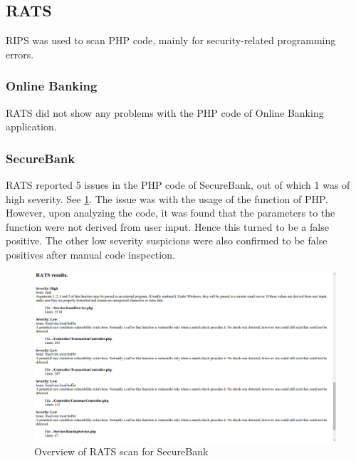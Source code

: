 \subsection{RATS}
RIPS was used to scan PHP code, mainly for security-related programming errors.

\subsubsection{Online Banking }
RATS did not show any problems with the PHP code of Online Banking application.

\subsubsection{SecureBank}
RATS reported 5 issues in the PHP code of SecureBank, out of which 1 was of high severity. See \ref{fig:rats_overview_secure_bank}.
The issue was with the usage of the  function of PHP. However, upon analyzing the code, it was found that the parameters to the function were not derived from user input. Hence this turned to be a false positive.
The other low severity suspicions were also confirmed to be false positives after manual code inspection.

\begin{figure}[ht]
	\centering
	\includegraphics[width=.8\linewidth]{figures/rats_overview_secure_bank.png}
	\caption{Overview of RATS scan for SecureBank}
	\label{fig:rats_overview_secure_bank}
\end{figure}